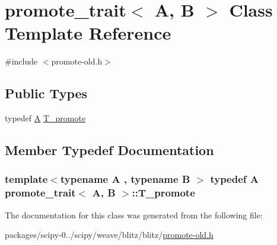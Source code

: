\hypertarget{classpromote__trait}{}\section{promote\+\_\+trait$<$ A, B $>$ Class Template Reference}
\label{classpromote__trait}


{\ttfamily \#include $<$promote-\/old.\+h$>$}

\subsection*{Public Types}
\begin{DoxyCompactItemize}
\item 
typedef \hyperlink{classA}{A} \hyperlink{classpromote__trait_a533fa496043a834e8fcfcb4ec2b54805}{T\+\_\+promote}
\end{DoxyCompactItemize}


\subsection{Member Typedef Documentation}
\hypertarget{classpromote__trait_a533fa496043a834e8fcfcb4ec2b54805}{}
\subsubsection[{T\+\_\+promote}]{\setlength{\rightskip}{0pt plus 5cm}template$<$typename A , typename B $>$ typedef {\bf A} {\bf promote\+\_\+trait}$<$ {\bf A}, B $>$\+::{\bf T\+\_\+promote}}\label{classpromote__trait_a533fa496043a834e8fcfcb4ec2b54805}


The documentation for this class was generated from the following file\+:\begin{DoxyCompactItemize}
\item 
packages/scipy-\/0../scipy/weave/blitz/blitz/\hyperlink{promote-old_8h}{promote-\/old.\+h}\end{DoxyCompactItemize}
